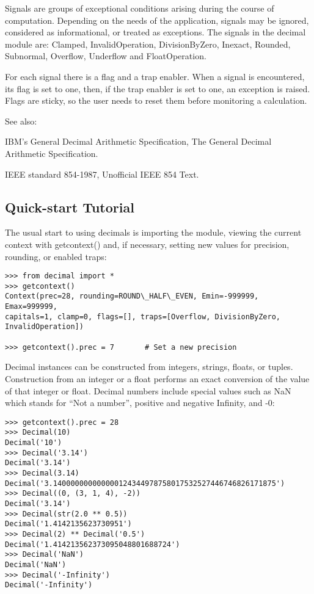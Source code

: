 \vpara
Signals are groups of exceptional conditions arising during the course of computation. Depending on the needs of the application, signals may be ignored, considered as informational, or treated as exceptions. The signals in the decimal module are: Clamped, InvalidOperation, DivisionByZero, Inexact, Rounded, Subnormal, Overflow, Underflow and FloatOperation.

\vpara
For each signal there is a flag and a trap enabler. When a signal is encountered, its flag is set to one, then, if the trap enabler is set to one, an exception is raised. Flags are sticky, so the user needs to reset them before monitoring a calculation.

\vpara
See also:

IBM's General Decimal Arithmetic Specification, The General Decimal Arithmetic Specification.

IEEE standard 854-1987, Unofficial IEEE 854 Text.



\subsection{Quick-start Tutorial}

The usual start to using decimals is importing the module, viewing the current context with getcontext() and, if necessary, setting new values for precision, rounding, or enabled traps:

\begin{lstlisting}
>>> from decimal import *
>>> getcontext()
Context(prec=28, rounding=ROUND\_HALF\_EVEN, Emin=-999999, Emax=999999,
capitals=1, clamp=0, flags=[], traps=[Overflow, DivisionByZero, 
InvalidOperation])

>>> getcontext().prec = 7       # Set a new precision
\end{lstlisting}

Decimal instances can be constructed from integers, strings, floats, or tuples. Construction from an integer or a float performs an exact conversion of the value of that integer or float. Decimal numbers include special values such as NaN which stands for “Not a number”, positive and negative Infinity, and -0:

\begin{lstlisting}
>>> getcontext().prec = 28
>>> Decimal(10)
Decimal('10')
>>> Decimal('3.14')
Decimal('3.14')
>>> Decimal(3.14)
Decimal('3.140000000000000124344978758017532527446746826171875')
>>> Decimal((0, (3, 1, 4), -2))
Decimal('3.14')
>>> Decimal(str(2.0 ** 0.5))
Decimal('1.4142135623730951')
>>> Decimal(2) ** Decimal('0.5')
Decimal('1.414213562373095048801688724')
>>> Decimal('NaN')
Decimal('NaN')
>>> Decimal('-Infinity')
Decimal('-Infinity')
\end{lstlisting}

